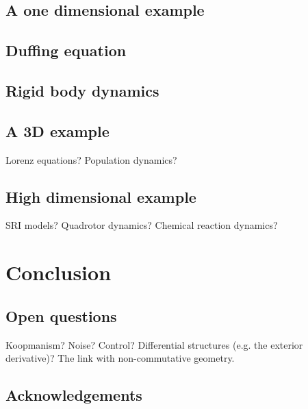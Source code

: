 \documentclass[12pt]{amsart}
\begin{document}
\subsection{A one dimensional example}

\subsection{Duffing equation}

\subsection{Rigid body dynamics}

\subsection{A 3D example}
Lorenz equations?  Population dynamics?

\subsection{High dimensional example}
SRI models?  Quadrotor dynamics?  Chemical reaction dynamics?

\section{Conclusion}

\subsection{Open questions}
Koopmanism?  Noise?  Control?  Differential structures (e.g. the exterior derivative)?  The link with non-commutative geometry.

\subsection{Acknowledgements}



\end{document}
